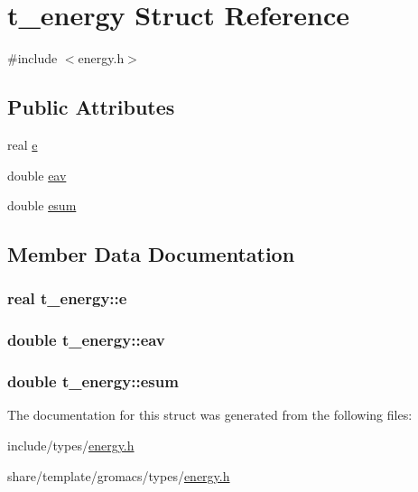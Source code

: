 \hypertarget{structt__energy}{\section{t\-\_\-energy \-Struct \-Reference}
\label{structt__energy}
}


{\ttfamily \#include $<$energy.\-h$>$}

\subsection*{\-Public \-Attributes}
\begin{DoxyCompactItemize}
\item 
real \hyperlink{structt__energy_a3ffdf65ee67ca919c12735c7935c69c3}{e}
\item 
double \hyperlink{structt__energy_ac96dc44807fd1881c5b5f2319cd9bca1}{eav}
\item 
double \hyperlink{structt__energy_a601ba0d0e4b20afe3901729306e02d78}{esum}
\end{DoxyCompactItemize}


\subsection{\-Member \-Data \-Documentation}
\hypertarget{structt__energy_a3ffdf65ee67ca919c12735c7935c69c3}{
\subsubsection[{e}]{\setlength{\rightskip}{0pt plus 5cm}real {\bf t\-\_\-energy\-::e}}}\label{structt__energy_a3ffdf65ee67ca919c12735c7935c69c3}
\hypertarget{structt__energy_ac96dc44807fd1881c5b5f2319cd9bca1}{
\subsubsection[{eav}]{\setlength{\rightskip}{0pt plus 5cm}double {\bf t\-\_\-energy\-::eav}}}\label{structt__energy_ac96dc44807fd1881c5b5f2319cd9bca1}
\hypertarget{structt__energy_a601ba0d0e4b20afe3901729306e02d78}{
\subsubsection[{esum}]{\setlength{\rightskip}{0pt plus 5cm}double {\bf t\-\_\-energy\-::esum}}}\label{structt__energy_a601ba0d0e4b20afe3901729306e02d78}


\-The documentation for this struct was generated from the following files\-:\begin{DoxyCompactItemize}
\item 
include/types/\hyperlink{include_2types_2energy_8h}{energy.\-h}\item 
share/template/gromacs/types/\hyperlink{share_2template_2gromacs_2types_2energy_8h}{energy.\-h}\end{DoxyCompactItemize}
